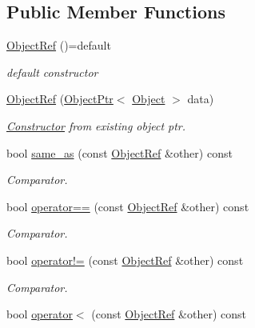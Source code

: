 \subsection*{Public Member Functions}
\begin{DoxyCompactItemize}
\item 
\hyperlink{classtvm_1_1runtime_1_1ObjectRef_aa07c1f6d66a438ea950637d13ed09471}{Object\+Ref} ()=default
\begin{DoxyCompactList}\small\item\em default constructor \end{DoxyCompactList}\item 
\hyperlink{classtvm_1_1runtime_1_1ObjectRef_a6a7dd7404edf1c26f8dbd9bd92d03a02}{Object\+Ref} (\hyperlink{classtvm_1_1runtime_1_1ObjectPtr}{Object\+Ptr}$<$ \hyperlink{classtvm_1_1runtime_1_1Object}{Object} $>$ data)
\begin{DoxyCompactList}\small\item\em \hyperlink{classtvm_1_1Constructor}{Constructor} from existing object ptr. \end{DoxyCompactList}\item 
bool \hyperlink{classtvm_1_1runtime_1_1ObjectRef_a62014c9eba5cae2ab5a84963725d6a65}{same\+\_\+as} (const \hyperlink{classtvm_1_1runtime_1_1ObjectRef}{Object\+Ref} \&other) const 
\begin{DoxyCompactList}\small\item\em Comparator. \end{DoxyCompactList}\item 
bool \hyperlink{classtvm_1_1runtime_1_1ObjectRef_ac8c2b78649a428e35e279d085d509e1b}{operator==} (const \hyperlink{classtvm_1_1runtime_1_1ObjectRef}{Object\+Ref} \&other) const 
\begin{DoxyCompactList}\small\item\em Comparator. \end{DoxyCompactList}\item 
bool \hyperlink{classtvm_1_1runtime_1_1ObjectRef_a2ae377cc59f98b42339d76bded1c1711}{operator!=} (const \hyperlink{classtvm_1_1runtime_1_1ObjectRef}{Object\+Ref} \&other) const 
\begin{DoxyCompactList}\small\item\em Comparator. \end{DoxyCompactList}\item 
bool \hyperlink{classtvm_1_1runtime_1_1ObjectRef_a17626209947c4a2f302422be451661c5}{operator$<$} (const \hyperlink{classtvm_1_1runtime_1_1ObjectRef}{Object\+Ref} \&other) const 

\end{DoxyCompactItemize}
